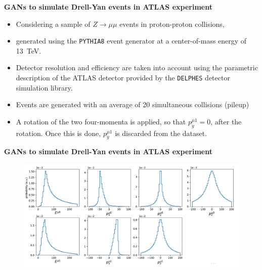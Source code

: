 \documentclass[11pt,aspectratio=169]{beamer}
\begin{document}
\begin{frame}{\underline{\secname}}
	
	
	\begin{center}
		\textbf{GANs to simulate Drell-Yan  events in  ATLAS experiment}
	\end{center}

		\begin{itemize}			  \setlength\itemsep{0em}
\item
    Considering a sample of $Z \to \mu \mu$ events in proton-proton collisions, 
    \item
    generated using the {\tt PYTHIA8} event generator at a center-of-mass energy of 13~TeV.
    \item
    Detector resolution and efficiency are taken into account using the parametric description of the ATLAS detector provided by the {\tt DELPHES} detector simulation library.
    \item
    Events are generated with an average of 20 simultaneous collisions (pileup)
	\item
	A rotation of the two four-momenta is applied, so that $p_y^{\mu 1}=0$, after the rotation. Once this is done, $p_y^{\mu 1}$ is discarded from the dataset.
			\end{itemize}

	
	\end{frame}

	
	
	\begin{frame}{\underline{\secname}}
	
	
	\begin{center}
		\textbf{GANs to simulate Drell-Yan events in  ATLAS experiment}
	\end{center}


\begin{figure}[H]
	\begin{center}
		\includegraphics[width=\textwidth]{slides/pdfresizer.com-pdf-crop}
	\end{center}
\end{figure}
	
 \end{frame}
\end{document}
